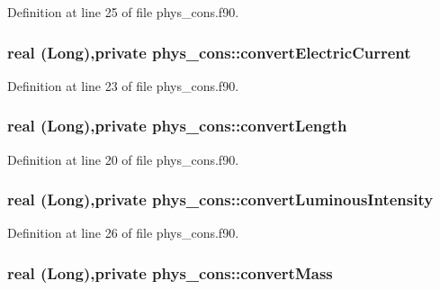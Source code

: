 Definition at line 25 of file phys\_\-cons.f90.

\hypertarget{namespacephys__cons_a653404efc4f25713af588bb6cad2b39e}{
\subsubsection[{convertElectricCurrent}]{\setlength{\rightskip}{0pt plus 5cm}real (Long),private {\bf phys\_\-cons::convertElectricCurrent}}}
\label{namespacephys__cons_a653404efc4f25713af588bb6cad2b39e}


Definition at line 23 of file phys\_\-cons.f90.

\hypertarget{namespacephys__cons_a6fe1cfa01be156ac1f0e51e3ab875f21}{
\subsubsection[{convertLength}]{\setlength{\rightskip}{0pt plus 5cm}real (Long),private {\bf phys\_\-cons::convertLength}}}
\label{namespacephys__cons_a6fe1cfa01be156ac1f0e51e3ab875f21}


Definition at line 20 of file phys\_\-cons.f90.

\hypertarget{namespacephys__cons_a64a60f517bd29fbe4a14a5097df961f4}{
\subsubsection[{convertLuminousIntensity}]{\setlength{\rightskip}{0pt plus 5cm}real (Long),private {\bf phys\_\-cons::convertLuminousIntensity}}}
\label{namespacephys__cons_a64a60f517bd29fbe4a14a5097df961f4}


Definition at line 26 of file phys\_\-cons.f90.

\hypertarget{namespacephys__cons_a48484815d32b74a1735ec19ba407ec5b}{
\subsubsection[{convertMass}]{\setlength{\rightskip}{0pt plus 5cm}real (Long),private {\bf phys\_\-cons::convertMass}}}
\label{namespacephys__cons_a48484815d32b74a1735ec19ba407ec5b}


